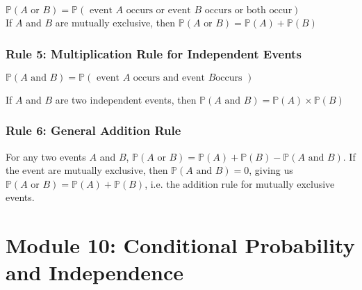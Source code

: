 \documentclass[12pt letter]{report}
\begin{document}

$\mathbb{P} \left( A \text{ or } B \right) = \mathbb{P} \left( \text{ event } A \text{ occurs or event } B \text{ occurs
    or both occur} \right)  $\\


\noindent If $A$ and $B$ are mutually exclusive, then $\mathbb{P} \left( A \text{ or } B \right) = \mathbb{P} \left( A
  \right) + \mathbb{P} \left( B \right)   $

\subsection{Rule 5: Multiplication Rule for Independent Events}
$\mathbb{P} \left( A \text{ and } B \right) = \mathbb{P} \left( \text{ event } A \text{ occurs and event } B \text{
    occurs } \right)  $



\noindent If $A$ and $B$ are two independent events, then $\mathbb{P} \left( A \text{ and } B \right) = \mathbb{P} \left( A
  \right)  \times \mathbb{P} \left( B \right)  $

\subsection{Rule 6: General Addition Rule}

For any two events $A$ and $B$, $\mathbb{P} \left( A \text{ or } B \right) = \mathbb{P} \left( A \right) + \mathbb{P}
  \left( B \right) - \mathbb{P} \left( A \text{ and } B \right)    $. If the event are mutually exclusive, then
$\mathbb{P} \left( A \text{ and } B \right) = 0 $, giving us $\mathbb{P} \left( A \text{ or } B \right) =
  \mathbb{P}\left( A \right) + \mathbb{P} \left( B \right)   $, i.e. the addition rule for mutually exclusive events.


\chapter{Module 10: Conditional Probability and Independence}
\end{document}
